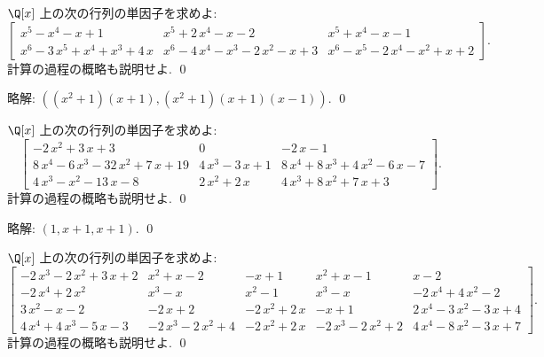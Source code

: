 \documentclass[12pt,twoside]{jarticle}
\newcommand\commentout[1]{#1}
\newcommand\commentout[1]{}
\begin{document}
\begin{question}
\label{q:ed-2}
  $\Q[x]$ 上の次の行列の単因子を求めよ:
  {\small
  \begin{equation*}
    \left[ 
      \begin{array}{ccc}
        {x}^{5} - {x}^{4} - {x} + 1 & {x}^{5} + 2\,{x}^{4} - {x} - 2 & {x
          }^{5} + {x}^{4} - {x} - 1 \\
        {x}^{6} - 3\,{x}^{5} + {x}^{4} + {x}^{3} + 4\,{x} & {x}^{6} - 4\,
        {x}^{4} - {x}^{3} - 2\,{x}^{2} - {x} + 3 & {x}^{6} - {x}^{5} - 2
        \,{x}^{4} - {x}^{2} + {x} + 2
      \end{array}
    \right].
  \end{equation*}
  }計算の過程の概略も説明せよ. \qed
\end{question}

\commentout{
\noindent
略解: $((x^2+1)(x+1), (x^2+1)(x+1)(x-1))$.
\qed
}


\begin{question}
\label{q:ed-3}
  $\Q[x]$ 上の次の行列の単因子を求めよ:
  \begin{equation*}
    \left[ 
      \begin{array}{ccc}
        - 2\,{x}^{2} + 3\,{x} + 3 & 0 &  - 2\,{x} - 1 \\
        8\,{x}^{4} - 6\,{x}^{3} - 32\,{x}^{2} + 7\,{x} + 19 & 4\,{x}^{3}
        - 3\,{x} + 1 & 8\,{x}^{4} + 8\,{x}^{3} + 4\,{x}^{2} - 6\,{x} - 7
        \\
        4\,{x}^{3} - {x}^{2} - 13\,{x} - 8 & 2\,{x}^{2} + 2\,{x} & 4\,{x}
        ^{3} + 8\,{x}^{2} + 7\,{x} + 3
      \end{array}
    \right].
  \end{equation*}
  計算の過程の概略も説明せよ. \qed
\end{question}

\commentout{
\noindent
略解: $(1,x+1,x+1)$.
\qed
}


\begin{question}
\label{q:ed-4}
  $\Q[x]$ 上の次の行列の単因子を求めよ:
  {\footnotesize
  \begin{equation*}
    \left[ 
      \begin{array}{ccccc}
        - 2\,{x}^{3} - 2\,{x}^{2} + 3\,{x} + 2 & {x}^{2} + {x} - 2 &  - 
        {x} + 1 & {x}^{2} + {x} - 1 & {x} - 2 \\
        - 2\,{x}^{4} + 2\,{x}^{2} & {x}^{3} - {x} & {x}^{2} - 1 & {x}^{3
          } - {x} &  - 2\,{x}^{4} + 4\,{x}^{2} - 2 \\
        3\,{x}^{2} - {x} - 2 &  - 2\,{x} + 2 &  - 2\,{x}^{2} + 2\,{x} & 
        - {x} + 1 & 2\,{x}^{4} - 3\,{x}^{2} - 3\,{x} + 4 \\
        4\,{x}^{4} + 4\,{x}^{3} - 5\,{x} - 3 &  - 2\,{x}^{3} - 2\,{x}^{2}
        + 4 &  - 2\,{x}^{2} + 2\,{x} &  - 2\,{x}^{3} - 2\,{x}^{2} + 2 & 
        4\,{x}^{4} - 8\,{x}^{2} - 3\,{x} + 7
      \end{array}
    \right].
  \end{equation*}
  }計算の過程の概略も説明せよ. \qed
\end{question}
\end{document}
